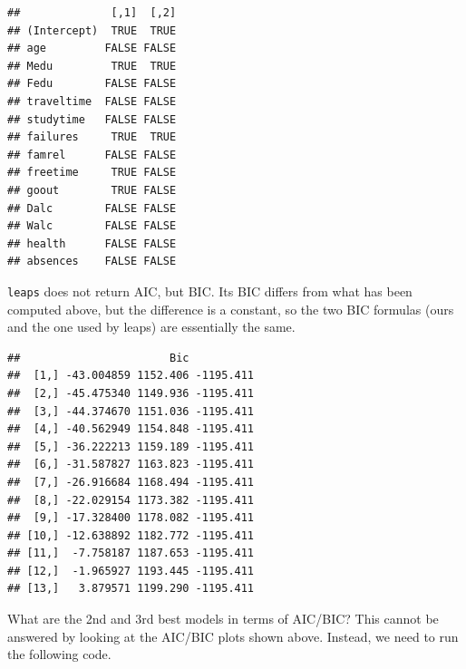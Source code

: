 \documentclass[
]{book}
\newenvironment{Shaded}{\begin{snugshade}}{\end{snugshade}}
\newcommand{\AttributeTok}[1]{\textcolor[rgb]{0.13,0.29,0.53}{#1}}
\newcommand{\CommentTok}[1]{\textcolor[rgb]{0.56,0.35,0.01}{\textit{#1}}}
\newcommand{\DecValTok}[1]{\textcolor[rgb]{0.00,0.00,0.81}{#1}}
\newcommand{\FloatTok}[1]{\textcolor[rgb]{0.00,0.00,0.81}{#1}}
\newcommand{\FunctionTok}[1]{\textcolor[rgb]{0.13,0.29,0.53}{\textbf{#1}}}
\newcommand{\NormalTok}[1]{#1}
\newcommand{\OtherTok}[1]{\textcolor[rgb]{0.56,0.35,0.01}{#1}}
\newcommand{\SpecialCharTok}[1]{\textcolor[rgb]{0.81,0.36,0.00}{\textbf{#1}}}
\begin{document}
\begin{verbatim}
##              [,1]  [,2]
## (Intercept)  TRUE  TRUE
## age         FALSE FALSE
## Medu         TRUE  TRUE
## Fedu        FALSE FALSE
## traveltime  FALSE FALSE
## studytime   FALSE FALSE
## failures     TRUE  TRUE
## famrel      FALSE FALSE
## freetime     TRUE FALSE
## goout        TRUE FALSE
## Dalc        FALSE FALSE
## Walc        FALSE FALSE
## health      FALSE FALSE
## absences    FALSE FALSE
\end{verbatim}

\texttt{leaps} does not return AIC, but BIC. Its BIC differs from what has been computed above, but the difference is a constant, so the two BIC formulas (ours and the one used by leaps) are essentially the same.

\begin{Shaded}
\end{Shaded}

\begin{verbatim}
##                       Bic          
##  [1,] -43.004859 1152.406 -1195.411
##  [2,] -45.475340 1149.936 -1195.411
##  [3,] -44.374670 1151.036 -1195.411
##  [4,] -40.562949 1154.848 -1195.411
##  [5,] -36.222213 1159.189 -1195.411
##  [6,] -31.587827 1163.823 -1195.411
##  [7,] -26.916684 1168.494 -1195.411
##  [8,] -22.029154 1173.382 -1195.411
##  [9,] -17.328400 1178.082 -1195.411
## [10,] -12.638892 1182.772 -1195.411
## [11,]  -7.758187 1187.653 -1195.411
## [12,]  -1.965927 1193.445 -1195.411
## [13,]   3.879571 1199.290 -1195.411
\end{verbatim}

What are the 2nd and 3rd best models in terms of AIC/BIC?
This cannot be answered by looking at the AIC/BIC plots shown above. Instead, we need to run the following code.

\begin{Shaded}
\end{Shaded}
\end{document}
